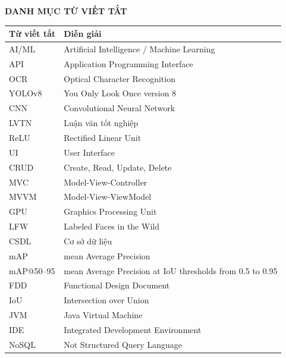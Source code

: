 \clearpage
\begin{center}
\textbf{\MakeUppercase{DANH MỤC TỪ VIẾT TẮT}}
\end{center}

\begin{center}
\begin{longtable}{|p{4cm}|p{9cm}|}
\hline
\textbf{Từ viết tắt} & \textbf{Diễn giải} \\ \hline
AI/ML & Artificial Intelligence / Machine Learning \\ \hline
API & Application Programming Interface \\ \hline
OCR & Optical Character Recognition \\ \hline
YOLOv8 & You Only Look Once version 8 \\ \hline
CNN & Convolutional Neural Network \\ \hline
LVTN & Luận văn tốt nghiệp \\ \hline
ReLU & Rectified Linear Unit \\ \hline
UI & User Interface \\ \hline
CRUD & Create, Read, Update, Delete \\ \hline
MVC & Model-View-Controller \\ \hline
MVVM & Model-View-ViewModel \\ \hline
GPU & Graphics Processing Unit \\ \hline
LFW & Labeled Faces in the Wild \\ \hline
CSDL & Cơ sở dữ liệu \\ \hline
mAP & mean Average Precision \\ \hline
mAP@50--95 & mean Average Precision at IoU thresholds from 0.5 to 0.95 \\ \hline
FDD & Functional Design Document \\ \hline
IoU & Intersection over Union \\ \hline
JVM & Java Virtual Machine \\ \hline
IDE & Integrated Development Environment \\ \hline
NoSQL & Not Structured Query Language \\ \hline



\end{longtable}
\end{center}

\clearpage

